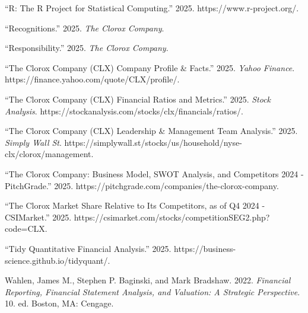 \documentclass[
  letterpaper,
  DIV=11,
  numbers=noendperiod]{scrartcl}
\newlength{\cslhangindent}
\newenvironment{CSLReferences}[2] %
 {\begin{list}{}{%
  \setlength{\itemindent}{0pt}
  \setlength{\leftmargin}{0pt}
  \setlength{\parsep}{0pt}
  \ifodd #1
   \setlength{\leftmargin}{\cslhangindent}
   \setlength{\itemindent}{-1\cslhangindent}
  \fi
  \setlength{\itemsep}{#2\baselineskip}}}
 {\end{list}}
\begin{document}
\begin{CSLReferences}{1}{0}
{``R: {The R Project} for {Statistical Computing}.''} 2025.
https://www.r-project.org/.

{``Recognitions.''} 2025. \emph{The Clorox Company}.

{``Responsibility.''} 2025. \emph{The Clorox Company}.

{``The {Clorox Company} ({CLX}) {Company Profile} \& {Facts}.''} 2025.
\emph{Yahoo Finance}. https://finance.yahoo.com/quote/CLX/profile/.

{``The {Clorox Company} ({CLX}) {Financial Ratios} and {Metrics}.''}
2025. \emph{Stock Analysis}.
https://stockanalysis.com/stocks/clx/financials/ratios/.

{``The {Clorox Company} ({CLX}) {Leadership} \& {Management Team
Analysis}.''} 2025. \emph{Simply Wall St}.
https://simplywall.st/stocks/us/household/nyse-clx/clorox/management.

{``The {Clorox Company}: {Business Model}, {SWOT Analysis}, and
{Competitors} 2024 - {PitchGrade}.''} 2025.
https://pitchgrade.com/companies/the-clorox-company.

{``The {Clorox Market} Share Relative to Its Competitors, as of {Q4}
2024 - {CSIMarket}.''} 2025.
https://csimarket.com/stocks/competitionSEG2.php?code=CLX.

{``Tidy {Quantitative Financial Analysis}.''} 2025.
https://business-science.github.io/tidyquant/.

Wahlen, James M., Stephen P. Baginski, and Mark Bradshaw. 2022.
\emph{Financial Reporting, Financial Statement Analysis, and Valuation:
A Strategic Perspective}. 10. ed. Boston, MA: Cengage.

\end{CSLReferences}
\end{document}
